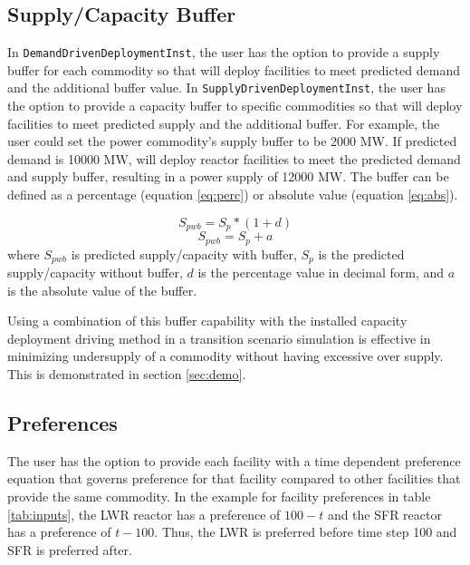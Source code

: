     \subsection{\textbf{Supply/Capacity Buffer}}
    In \texttt{DemandDrivenDeploymentInst}, the user has the option 
    to provide a supply buffer for each commodity so that 
    \deploy will deploy facilities to meet predicted demand and the
    additional buffer value. 
    In \texttt{SupplyDrivenDeploymentInst}, the user has the option 
    to provide a capacity buffer to specific commodities so that 
    \deploy will deploy facilities to meet predicted supply and the
    additional buffer.
    For example, the user could set the power commodity's supply buffer 
    to be 2000 MW. 
    If predicted demand is 10000 MW, \deploy will deploy reactor 
    facilities to meet the predicted demand and supply buffer, resulting 
    in a power supply of 12000 MW.  
    The buffer can be defined as a percentage (equation \ref{eq:perc}) 
    or absolute value (equation \ref{eq:abs}). 
    
    \begin{equation}
        \label{eq:perc}
        S_{pwb} = S_{p}*(1+d)
    \end{equation}
    \begin{equation}
        \label{eq:abs}
        S_{pwb} = S_{p}+a
    \end{equation}
    where $S_{pwb}$ is predicted supply/capacity with buffer, 
    $S_p$ is the predicted supply/capacity without buffer, 
    $d$ is the percentage value in decimal form, 
    and $a$ is the absolute value of the buffer. 
    
    Using a combination of this buffer capability with the 
    installed capacity deployment driving method in a transition 
    scenario simulation is effective in minimizing undersupply of a 
    commodity without having excessive over supply. 
    This is demonstrated in section \ref{sec:demo}. 
    
    \subsection{\textbf{Preferences}}
    The user has the option to provide each facility with
    a time dependent preference equation that governs preference for 
    that facility compared to other facilities that provide the same 
    commodity. 
    In the example for facility preferences in table \ref{tab:inputs}, 
    the \gls{LWR} reactor has a preference of $100-t$ and the 
    \gls{SFR} reactor has a preference of $t-100$. 
    Thus, the \gls{LWR} is preferred before time step 100 and \gls{SFR}
    is preferred after. 
    
